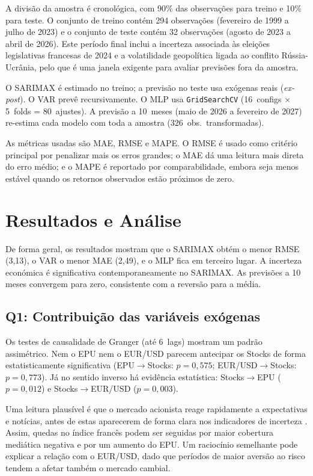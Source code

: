 \documentclass[12pt,a4paper]{article}
\begin{document}
A divisão da amostra é cronológica, com 90\% das observações para treino e 10\% para teste. O conjunto de treino contém 294 observações (fevereiro de 1999 a julho de 2023) e o conjunto de teste contém 32 observações (agosto de 2023 a abril de 2026). Este período final inclui a incerteza associada às eleições legislativas francesas de 2024 e a volatilidade geopolítica ligada ao conflito Rússia-Ucrânia, pelo que é uma janela exigente para avaliar previsões fora da amostra.

O SARIMAX é estimado no treino; a previsão no teste usa exógenas reais (\textit{ex-post}). O VAR prevê recursivamente. O MLP usa \texttt{GridSearchCV} (16~configs $\times$ 5~folds = 80~ajustes). A previsão a 10~meses (maio de 2026 a fevereiro de 2027) re-estima cada modelo com toda a amostra (326~obs.\ transformadas).

As métricas usadas são MAE, RMSE e MAPE. O RMSE é usado como critério principal por penalizar mais os erros grandes; o MAE dá uma leitura mais direta do erro médio; e o MAPE é reportado por comparabilidade, embora seja menos estável quando os retornos observados estão próximos de zero.

\section{Resultados e Análise}

De forma geral, os resultados mostram que o SARIMAX obtém o menor RMSE (3,13), o VAR o menor MAE (2,49), e o MLP fica em terceiro lugar. A incerteza económica é significativa contemporaneamente no SARIMAX. As previsões a 10 meses convergem para zero, consistente com a reversão para a média.

\subsection*{Q1: Contribuição das variáveis exógenas}

Os testes de causalidade de Granger (até 6~lags) mostram um padrão assimétrico. Nem o EPU nem o EUR/USD parecem antecipar os Stocks de forma estatisticamente significativa (EPU$\to$Stocks: $p=0{,}575$; EUR/USD$\to$Stocks: $p=0{,}773$). Já no sentido inverso há evidência estatística: Stocks$\to$EPU ($p=0{,}012$) e Stocks$\to$EUR/USD ($p=0{,}003$).

Uma leitura plausível é que o mercado acionista reage rapidamente a expectativas e notícias, antes de estas aparecerem de forma clara nos indicadores de incerteza \citep{fama1970efficient}. Assim, quedas no índice francês podem ser seguidas por maior cobertura mediática negativa e por um aumento do EPU. Um raciocínio semelhante pode explicar a relação com o EUR/USD, dado que períodos de maior aversão ao risco tendem a afetar também o mercado cambial.
\end{document}
